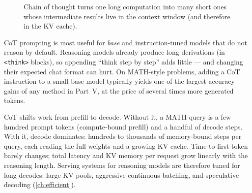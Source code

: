 \begin{figure}[t]
\centering
{}
\caption{Chain of thought turns one long computation into many short ones whose intermediate
results live in the context window (and therefore in the KV cache).}
\label{fig:scaling:cot}
\end{figure}

\begin{keyidea}
CoT prompting is most useful for \emph{base} and instruction-tuned models that do not reason by
default. Reasoning models already produce long derivations (in \texttt{<think>} blocks), so
appending ``think step by step'' adds little --- and changing their expected chat format can hurt.
On MATH-style problems, adding a CoT instruction to a small base model typically yields one of the
largest accuracy gains of any method in Part~V, at the price of several times more generated
tokens.
\end{keyidea}

\begin{systemslens}
CoT shifts work from prefill to decode. Without it, a MATH query is a few hundred prompt tokens
(compute-bound prefill) and a handful of decode steps. With it, decode dominates: hundreds to
thousands of memory-bound steps per query, each reading the full weights and a growing KV cache.
Time-to-first-token barely changes; total latency and KV memory per request grow linearly with
the reasoning length. Serving systems for reasoning models are therefore tuned for long decodes:
large KV pools, aggressive continuous batching, and speculative decoding (\cref{ch:efficient}).
\end{systemslens}

